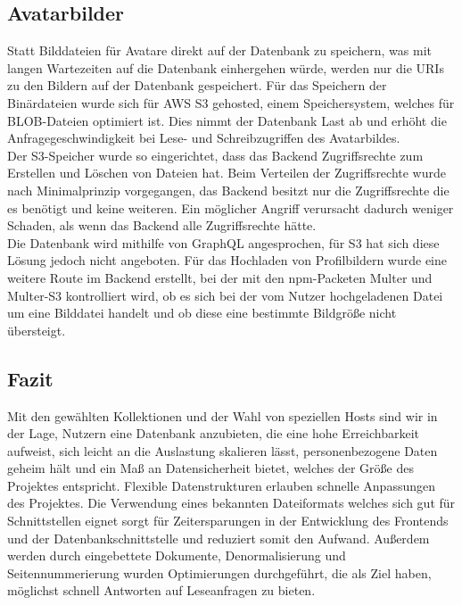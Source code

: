 \subsection{Avatarbilder}
Statt Bilddateien für Avatare direkt auf der Datenbank zu speichern, was mit langen Wartezeiten auf die Datenbank einhergehen würde, werden nur die URIs zu den Bildern auf der Datenbank gespeichert. Für das Speichern der Binärdateien wurde sich für AWS S3 gehosted, einem Speichersystem, welches für BLOB-Dateien optimiert ist. Dies nimmt der Datenbank Last ab und erhöht die Anfragegeschwindigkeit bei Lese- und Schreibzugriffen des Avatarbildes.\\
Der S3-Speicher wurde so eingerichtet, dass das Backend Zugriffsrechte zum Erstellen und Löschen von Dateien hat. Beim Verteilen der Zugriffsrechte wurde nach Minimalprinzip vorgegangen, das Backend besitzt nur die Zugriffsrechte die es benötigt und keine weiteren. Ein möglicher Angriff verursacht dadurch weniger Schaden, als wenn das Backend alle Zugriffsrechte hätte.\\
Die Datenbank wird mithilfe von GraphQL angesprochen, für S3 hat sich diese Lösung jedoch nicht angeboten. Für das Hochladen von Profilbildern wurde eine weitere Route im Backend erstellt, bei der mit den npm-Packeten Multer und Multer-S3 kontrolliert wird, ob es sich bei der vom Nutzer hochgeladenen Datei um eine Bilddatei handelt und ob diese eine bestimmte Bildgröße nicht übersteigt.\\

\subsection{Fazit}
Mit den gewählten Kollektionen und der Wahl von speziellen Hosts sind wir in der Lage, Nutzern eine Datenbank anzubieten, die eine hohe Erreichbarkeit aufweist, sich leicht an die Auslastung skalieren lässt, personenbezogene Daten geheim hält und ein Maß an Datensicherheit bietet, welches der Größe des Projektes entspricht. Flexible Datenstrukturen erlauben schnelle Anpassungen des Projektes. Die Verwendung eines bekannten Dateiformats welches sich gut für Schnittstellen eignet sorgt für Zeitersparungen in der Entwicklung des Frontends und der Datenbankschnittstelle und reduziert somit den Aufwand. Außerdem werden durch eingebettete Dokumente, Denormalisierung und Seitennummerierung wurden Optimierungen durchgeführt, die als Ziel haben, möglichst schnell Antworten auf Leseanfragen zu bieten.